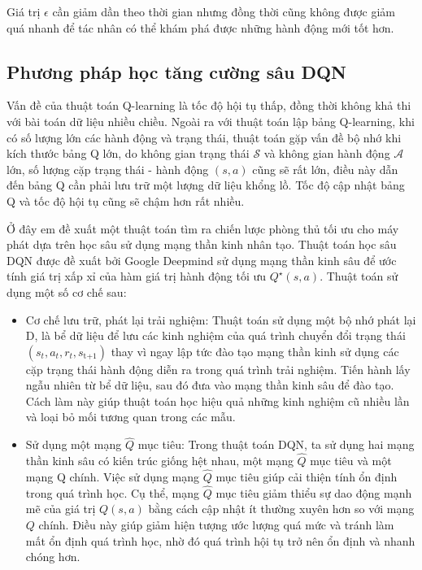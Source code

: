 \documentclass{uetgraduation}
\begin{document}
Giá trị $\epsilon$ cần giảm dần theo thời gian nhưng đồng thời cũng không được giảm quá nhanh để tác nhân có thể khám phá được những hành động mới tốt hơn.

\subsection{Phương pháp học tăng cường sâu DQN}
Vấn đề của thuật toán Q-learning là tốc độ hội tụ thấp, đồng thời không khả thi với bài toán dữ liệu nhiều chiều. Ngoài ra với thuật toán lập bảng Q-learning,
khi có số lượng lớn các hành động và trạng thái, thuật toán gặp vấn đề bộ nhớ khi kích thước bảng Q lớn, do không gian trạng thái $\mathcal{S}$ và không gian hành động $\mathcal{A}$
lớn, số lượng cặp trạng thái - hành động $(s,a)$ cũng sẽ rất lớn, điều này dẫn đến bảng Q cần phải lưu trữ một lượng dữ liệu khổng lồ. Tốc độ cập nhật bảng Q và tốc độ hội tụ cũng sẽ
chậm hơn rất nhiều.

Ở đây em đề xuất một thuật toán tìm ra chiến lược phòng thủ tối ưu cho máy phát dựa trên học sâu sử dụng mạng thần kinh nhân tạo. Thuật toán học sâu DQN được đề xuất bởi Google Deepmind 
sử dụng mạng thần kinh sâu để ước tính giá trị xấp xỉ của hàm giá trị hành động tối ưu $Q^\star (s, a)$. Thuật toán sử dụng một số cơ chế sau:
\begin{itemize}
    \item Cơ chế lưu trữ, phát lại trải nghiệm: Thuật toán sử dụng một bộ nhớ phát lại D, là bể dữ liệu để lưu các kinh nghiệm của quá trình chuyển đổi trạng thái $(s_t, a_t, r_t, s_\text{t+1})$
    thay vì ngay lập tức đào tạo mạng thần kinh sử dụng các cặp trạng thái hành động diễn ra trong quá trình trải nghiệm. Tiến hành lấy ngẫu nhiên từ bể dữ liệu, sau đó đưa vào
    mạng thần kinh sâu để đào tạo. Cách làm này giúp thuật toán học hiệu quả những kinh nghiệm cũ nhiều lần và loại bỏ mối tương quan trong các mẫu.

    \item  Sử dụng một mạng $\hat{Q}$ mục tiêu: Trong thuật toán DQN, ta sử dụng hai mạng thần kinh sâu có kiến trúc giống hệt nhau, một mạng $\hat{Q}$ mục tiêu và một mạng Q chính. Việc sử dụng mạng
    $\hat{Q}$ mục tiêu giúp cải thiện tính ổn định trong quá trình học. Cụ thể, mạng $\hat{Q}$ mục tiêu giảm thiểu sự dao động mạnh mẽ của giá trị $Q(s, a)$ bằng cách cập nhật ít thường xuyên hơn so với
    mạng $Q$ chính. Điều này giúp giảm hiện tượng ước lượng quá mức và tránh làm mất ổn định quá trình học, nhờ đó quá trình hội tụ trở nên ổn định và nhanh chóng hơn.
\end{itemize}
\end{document}
